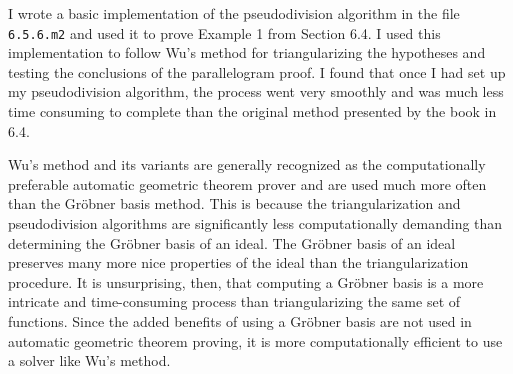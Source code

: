 \documentclass{article}
\theoremstyle{plain}
\theoremstyle{definition}
\theoremstyle{remark}
\newcommand{\gro}{Gr\"obner }
\begin{document}
I wrote a basic implementation of the pseudodivision algorithm in the file \texttt{6.5.6.m2} and used it to prove Example 1 from Section 6.4. 
I used this implementation to follow Wu's method for triangularizing the hypotheses and testing the conclusions of the parallelogram proof.
I found that once I had set up my pseudodivision algorithm, the process went very smoothly and was much less time consuming to complete than the original method presented by the book in 6.4.

Wu's method and its variants are generally recognized as the computationally preferable automatic geometric theorem prover and are used much more often than the Gröbner basis method.
This is because the triangularization and pseudodivision algorithms are significantly less computationally demanding than determining the Gröbner basis of an ideal.
The \gro basis of an ideal preserves many more nice properties of the ideal than the triangularization procedure. 
It is unsurprising, then, that computing a \gro basis is a more intricate and time-consuming process than triangularizing the same set of functions.
Since the added benefits of using a \gro basis are not used in automatic geometric theorem proving, it is more computationally efficient to use a solver like Wu's method.
\end{document}
